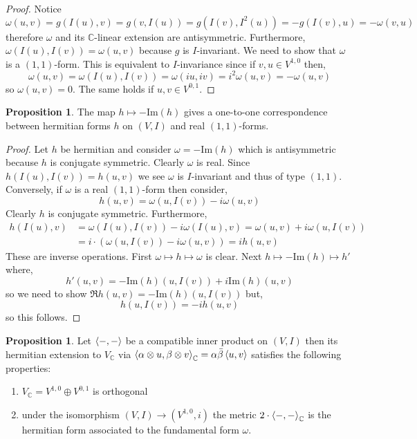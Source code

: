 \documentclass[12pt]{extarticle}
\newcommand{\C}{\mathbb{C}}
\renewcommand{\Im}[1]{\mathrm{Im}(#1)}
\theoremstyle{definition}
\newtheorem{proposition}[theorem]{Proposition}
\begin{document}
\begin{proof}
Notice $\omega(u,v) = g(I(u), v) = g(v, I(u)) = g(I(v), I^2(u)) = - g(I(v), u) = - \omega(v, u)$ therefore $\omega$ and its $\C$-linear extension are antisymmetric. Furthermore, $\omega(I(u), I(v)) = \omega(u,v)$ because $g$ is $I$-invariant. We need to show that $\omega$ is a $(1,1)$-form. This is equivalent to $I$-invariance since if $v,u \in V^{1,0}$ then,
\[ \omega(u,v) = \omega(I(u), I(v)) = \omega(iu, iv) = i^2 \omega(u,v) = - \omega(u, v) \]
so $\omega(u,v) = 0$. The same holds if $u,v \in V^{0,1}$. 
\end{proof}

\begin{proposition}
The map $h \mapsto - \Im{h}$ gives a one-to-one correspondence between hermitian forms $h$ on $(V, I)$ and real $(1,1)$-forms.  
\end{proposition}

\begin{proof}
Let $h$ be hermitian and consider $\omega = - \Im{h}$ which is antisymmetric because $h$ is conjugate symmetric. Clearly $\omega$ is real. Since $h(I(u), I(v)) = h(u, v)$ we see $\omega$ is $I$-invariant and thus of type $(1,1)$. Conversely, if $\omega$ is a real $(1,1)$-form then consider,
\[ h(u,v) = \omega(u, I(v)) - i \omega(u, v) \]
Clearly $h$ is conjugate symmetric. Furthermore, \begin{align*}
h(I(u), v) & = \omega(I(u), I(v)) - i \omega(I(u), v) = \omega(u, v) + i \omega(u, I(v)) 
\\
& = i \cdot (\omega(u, I(v)) - i \omega(u, v)) = i h(u, v)
\end{align*}
These are inverse operations. First $\omega \mapsto h \mapsto \omega$ is clear. Next $h \mapsto - \Im{h} \mapsto h'$ where,
\[ h'(u,v) = -\Im{h}(u, I(v)) + i \Im{h}(u, v) \]
so we need to show $\Re{h}(u, v) = - \Im{h}(u, I(v))$ but,
\[ h(u, I(v)) = -i h(u, v) \]
so this follows. 
\end{proof}

\begin{proposition}
Let $\left< -, - \right>$ be a compatible inner product on $(V, I)$ then its hermitian extension to $V_\C$ via $\inner{\alpha \otimes u}{\beta \otimes v}_\C = \alpha \bar{\beta}\inner{u}{v}$ satisfies the following properties:
\begin{enumerate}
\item $V_\C = V^{1,0} \oplus V^{0, 1}$ is orthogonal
\item under the isomorphism $(V,I) \to (V^{1,0}, i)$ the metric $2 \cdot \inner{-}{-}_\C$ is the hermitian form associated to the fundamental form $\omega$.
\end{enumerate}
\end{proposition}
\end{document}
